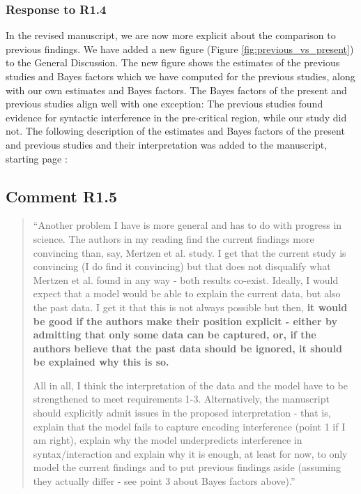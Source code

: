 \documentclass[12pt]{article}
\begin{document}
\subsubsection*{Response to R1.4}
In the revised manuscript, we are now more explicit about the comparison to previous findings. We have added a new figure (Figure \ref{fig:previous_vs_present}) to the General Discussion. The new figure shows the estimates of the previous studies and Bayes factors which we have computed for the previous studies, along with our own estimates and Bayes factors. The Bayes factors of the present and previous studies align well with one exception: The previous studies found evidence for syntactic interference in the pre-critical
region, while our study did not. The following description of the estimates and Bayes factors of the present and previous studies and their interpretation was added to the manuscript, starting page \pageref{comparison}:
\setcounter{figure}{13}

\begin{quote}
\end{quote}

\newpage

\subsection*{Comment R1.5}
\begin{quote}
``Another problem I have is more general and has to do with progress in science. The authors in my reading find the current findings more convincing than, say, Mertzen et al. study. I get that the current study is convincing (I do find it convincing) but that does not disqualify what Mertzen et al. found in any way - both results co-exist. Ideally, I would expect that a model would be able to explain the current data, but also the past data. I get it that this is not always possible but then, \textbf{it would be good if the authors make their position explicit - either by admitting that only some data can be captured, or, if the authors believe that the past data should be ignored, it should be explained why this is so.}

All in all, I think the interpretation of the data and the model have to be strengthened to meet requirements 1-3. Alternatively, the manuscript should explicitly admit issues in the proposed interpretation - that is, explain that the model fails to capture encoding interference (point 1 if I am right), explain why the model underpredicts interference in syntax/interaction and explain why it is enough, at least for now, to only model the current findings and to put previous findings aside (assuming they actually differ - see point 3 about Bayes factors above).''\end{quote}
\end{document}
